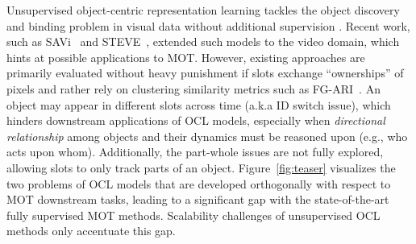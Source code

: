 Unsupervised object-centric representation learning tackles the object discovery and binding problem in visual data without additional supervision \cite{seitzer2022bridging}. %
Recent work, such as SAVi~\cite{kipf2022conditional} and STEVE~\cite{singh2022simple}, extended such models to the video domain, which hints at possible applications to MOT. %
However, existing approaches are primarily evaluated without heavy punishment if slots exchange ``ownerships'' of pixels and rather rely on clustering similarity metrics such as FG-ARI~\cite{kipf2022conditional}. An object may appear in different slots across time (a.k.a ID switch issue),  which hinders downstream applications of OCL models, especially when \emph{directional relationship} among objects and their dynamics must be reasoned upon (e.g., who acts upon whom). Additionally, the part-whole issues are not fully explored, allowing slots to only track parts of an object. Figure~\ref{fig:teaser} visualizes the two problems of OCL models that are developed orthogonally with respect to MOT downstream tasks, leading to a significant gap with the state-of-the-art fully supervised MOT methods.
Scalability challenges of unsupervised OCL methods only accentuate this gap.




